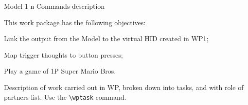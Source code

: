 
\begin{workpackage}{Model 1 n Commands}
  \label{wp:m1cN} %
description



  \makewptable %
    
  \begin{wpobjectives}
    This work package has the following objectives:
    \begin{enumerate*}
    \item Link the output from the Model to the virtual HID created in WP1;
    \item Map trigger thoughts to button presses; 
    \item Play a game of 1P Super Mario Bros.
    \end{enumerate*}
  \end{wpobjectives}
  
  \begin{wpdescription}
 
    Description of work carried out in WP, broken down into tasks, and
    with role of partners list. Use the \texttt{\textbackslash wptask} command.

    

\end{wpdescription}
\end{workpackage}
